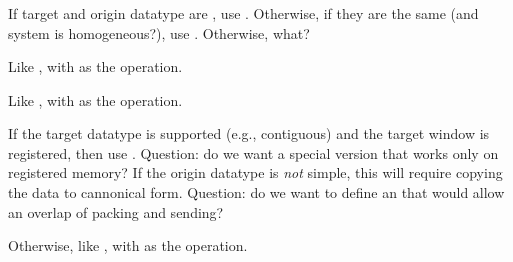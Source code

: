 \documentclass{article}
\begin{document}
\subsubsection{}
\begin{adi3}
\begin{mmadi}If target and origin datatype are
, use 
  .  Otherwise, if they are the same (and system is
  homogeneous?), use .  
  Otherwise, what?

\begin{tcp}
Like , with  as the operation.  
\end{tcp}

\begin{shmem}
Like , with  as the operation.  
\end{shmem}

\begin{via}
If the target datatype is supported (e.g., contiguous) and the target window
is registered, then use .  Question: do we want a
special version that works only on registered memory?  If the origin datatype
is \emph{not} simple, this will require copying the data to cannonical form.
Question: do we want to define an  that would
allow an overlap of packing and sending?

Otherwise, like , with  as the
operation.  
\end{via}

\end{mmadi}
\end{adi3}
\end{document}
